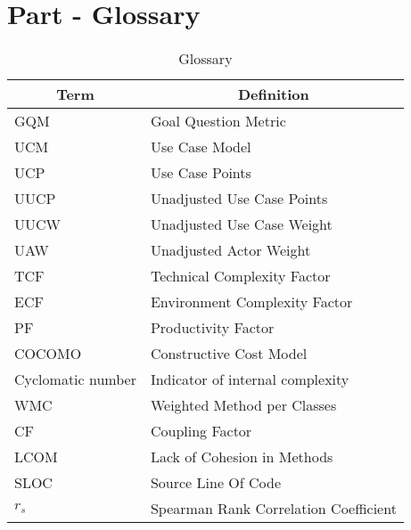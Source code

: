 \documentclass[12pt]{article}
\begin{document}
\section{Part - Glossary}
\begin{table}[h]
\centering
\begin{tabular}{|l|l|}
\hline
\multicolumn{1}{|c|}{\textbf{Term}} & \multicolumn{1}{c|}{\textbf{Definition}} \\ \hline
GQM & Goal Question Metric \\ \hline
UCM & Use Case Model \\ \hline
UCP & Use Case Points \\ \hline
UUCP & Unadjusted Use Case Points \\ \hline
UUCW & Unadjusted Use Case Weight \\ \hline
UAW & Unadjusted Actor Weight \\ \hline
TCF & Technical Complexity Factor \\ \hline
ECF & Environment Complexity Factor \\ \hline
PF & Productivity Factor \\ \hline
COCOMO & Constructive Cost Model \\ \hline
Cyclomatic number & Indicator of internal complexity \\ \hline
WMC & Weighted Method per Classes \\ \hline
CF & Coupling Factor \\ \hline
LCOM & Lack of Cohesion in Methods \\ \hline
SLOC & Source Line Of Code \\ \hline
$r_{s}$ & Spearman Rank Correlation Coefficient \\ \hline
\end{tabular}
\caption{Glossary}
\end{table}
{}

\end{document}
